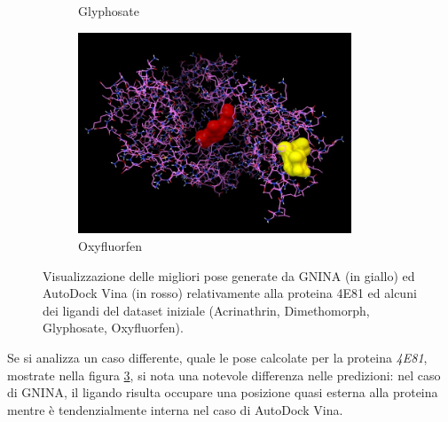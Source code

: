 \begin{figure}[H]
\begin{subfigure}[b]{0.475\textwidth}
        \caption[]%
        {{\small Glyphosate}}    
        \label{fig:4e81_glyphosate}
    \end{subfigure}
    \hfill
    \begin{subfigure}[b]{0.475\textwidth}   
        \centering 
        \includegraphics[width=\textwidth, height=6cm]{immagini/capitolo4/4e81_oxyfluorfen.jpg}
        \caption[]%
        {{\small Oxyfluorfen}}    
        \label{fig:4e81_oxyfluorfen}
    \end{subfigure}
    \caption[Conformazioni proteina-ligando per la proteina 4E81.]
    {\small Visualizzazione delle migliori pose generate da GNINA (in giallo) ed AutoDock Vina (in rosso) relativamente alla proteina 4E81 ed alcuni dei ligandi del dataset iniziale (Acrinathrin, Dimethomorph, Glyphosate, Oxyfluorfen).} 
    \label{fig:4e81}
\end{figure}

Se si analizza un caso differente, quale le pose calcolate per la proteina \textit{4E81}, mostrate nella figura \ref{fig:4e81}, si nota una notevole differenza nelle predizioni: nel caso di GNINA, il ligando risulta occupare una posizione quasi esterna alla proteina mentre è tendenzialmente interna nel caso di AutoDock Vina.

